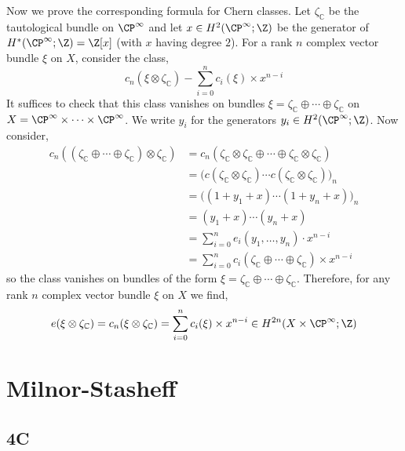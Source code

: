 \documentclass[12pt]{extarticle}
\newcommand{\C}{\mathbb{C}}
\begin{document}
Now we prove the corresponding formula for Chern classes. Let $\zeta_\C$ be the tautological bundle on $\CP^\infty$ and let $x \in H^2(\CP^\infty;\Z)$ be the generator of $H^*(\CP^\infty ; \Z) = \Z[x]$ (with $x$ having degree $2$). For a rank $n$ complex vector bundle $\xi$ on $X$, consider the class,
\[ c_n(\xi \otimes \zeta_\C) - \sum_{i = 0}^n c_i(\xi) \times x^{n-i} \]
It suffices to check that this class vanishes on bundles $\xi = \zeta_\C \oplus \cdots \oplus \zeta_\C$ on $X = \CP^\infty \times \cdots \times \CP^\infty$. We write $y_i$ for the generators $y_i \in H^2(\CP^\infty; \Z)$. Now consider,
\begin{align*}
c_n((\zeta_\C \oplus \cdots \oplus \zeta_\C) \otimes \zeta_\C) & = c_n(\zeta_\C \otimes \zeta_\C \oplus \cdots \oplus \zeta_\C \otimes \zeta_\C) 
\\
& = \big( c(\zeta_\C \otimes \zeta_\C) \cdots c(\zeta_\C \otimes \zeta_\C) \big)_n
\\
& = \big( (1 + y_1 + x) \cdots (1 + y_n + x) \big)_n
\\
& = (y_1 + x) \cdots (y_n + x) 
\\
& = \sum_{i = 0}^n e_i(y_1, \dots, y_n) \cdot x^{n-i}
\\
& = \sum_{i = 0}^n c_i(\zeta_\C \oplus \cdots \oplus \zeta_\C) \times x^{n-i}
\end{align*}
so the class vanishes on bundles of the form $\xi = \zeta_\C \oplus \cdots \oplus \zeta_\C$.
Therefore, for any rank $n$ complex vector bundle $\xi$ on $X$ we find,
\[ e(\xi \otimes \zeta_\C) = c_n(\xi \otimes \zeta_\C) = \sum_{i = 0}^n c_i(\xi) \times x^{n-i} \in H^{2n}(X \times \CP^\infty; \Z) \]

\section{Milnor-Stasheff}

\subsection{4C}
\end{document}
